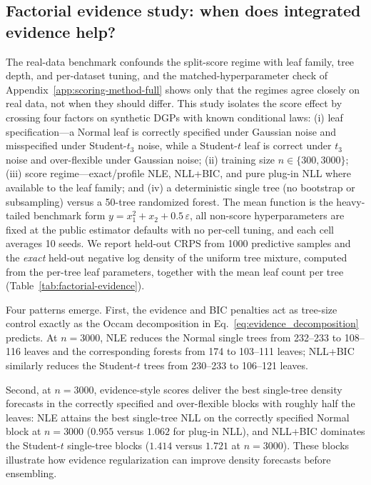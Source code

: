 \begin{landscape}

\end{landscape}

\subsection{Factorial evidence study: when does integrated evidence help?}\label{app:factorial-evidence}

The real-data benchmark confounds the split-score regime with leaf family, tree depth, and per-dataset tuning, and the matched-hyperparameter check of Appendix~\ref{app:scoring-method-full} shows only that the regimes agree closely on real data, not when they should differ. This study isolates the score effect by crossing four factors on synthetic DGPs with known conditional laws: (i) leaf specification---a Normal leaf is correctly specified under Gaussian noise and misspecified under Student-$t_3$ noise, while a Student-$t$ leaf is correct under $t_3$ noise and over-flexible under Gaussian noise; (ii) training size $n\in\{300,3000\}$; (iii) score regime---exact/profile NLE, NLL+BIC, and pure plug-in NLL where available to the leaf family; and (iv) a deterministic single tree (no bootstrap or subsampling) versus a 50-tree randomized forest. The mean function is the heavy-tailed benchmark form $y = x_1^2 + x_2 + 0.5\,\varepsilon$, all non-score hyperparameters are fixed at the public estimator defaults with no per-cell tuning, and each cell averages 10 seeds. We report held-out CRPS from 1000 predictive samples and the \emph{exact} held-out negative log density of the uniform tree mixture, computed from the per-tree leaf parameters, together with the mean leaf count per tree (Table~\ref{tab:factorial-evidence}).



Four patterns emerge. First, the evidence and BIC penalties act as tree-size control exactly as the Occam decomposition in Eq.~\eqref{eq:evidence_decomposition} predicts. At $n=3000$, NLE reduces the Normal single trees from 232--233 to 108--116 leaves and the corresponding forests from 174 to 103--111 leaves; NLL+BIC similarly reduces the Student-$t$ trees from 230--233 to 106--121 leaves.

Second, at $n=3000$, evidence-style scores deliver the best single-tree density forecasts in the correctly specified and over-flexible blocks with roughly half the leaves: NLE attains the best single-tree NLL on the correctly specified Normal block at $n=3000$ ($0.955$ versus $1.062$ for plug-in NLL), and NLL+BIC dominates the Student-$t$ single-tree blocks ($1.414$ versus $1.721$ at $n=3000$). These blocks illustrate how evidence regularization can improve density forecasts before ensembling.

